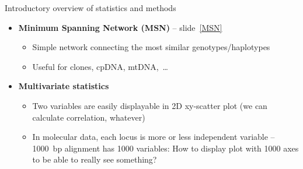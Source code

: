 \documentclass[compress, ucs, xelatex, 11pt, xcolor=svgnames,
  hyperref={
    bookmarks=true,
    unicode=true,
    colorlinks=true,
    pdftitle={Molecular data in R},
    plainpages=false,
    pdfauthor={Vojtech Zeisek},
    pdfsubject={Course about phylogeny and evolution in R},
    pdfcreator={XeLaTeX},
    pdfkeywords={R, evolution, phylogeny, molecular data},
    linkcolor=Tomato,
    anchorcolor=SaddleBrown,
    citecolor=Goldenrod,
    filecolor=DarkMagenta,
    menucolor=Sienna,
    urlcolor=DarkTurquoise,
    pdftex},
  url={hyphens, lowtilde} %
  ]{beamer}
\begin{document}
\begin{frame}[allowframebreaks]{Introductory overview of statistics and methods}
\begin{itemize}
\begin{itemize}
      \item \textbf{Hierarchical clustering} -- from slide~\ref{hierclust}
      \begin{itemize}
	\item Several methods clustering individuals according to their (dis)similarity from top or down into clusters
	\item (Un)weighted per-group mean average (\textbf{U/WPGMA}) and others
	\item Used more in ecology, for genetic data not so much anymore (following methods use to produce better results)
      \end{itemize}
      \item \textbf{Neighbor-Joining (NJ)} -- from slide~\ref{NJ}
      \begin{itemize}
	\item A tree starting from the two most similar individuals and connecting in the next steps next and next the most similar individual
	\item In some cases artificially chains individuals
	\item Several methods try to improve it -- slide~\ref{NJ-replacement}
      \end{itemize}
      \item \textbf{Principal Coordinates Analysis (PCoA)} -- from slide~\ref{pcoa}
      \begin{itemize}
	\item The most common method of multivariate statistics for genetic data
	\item Shows individuals in 2D scatter plot to retain maximum variability (by finding correlations among loci)
      \end{itemize}
    \end{itemize}
    \item \textbf{Minimum Spanning Network (MSN)} -- slide~\ref{MSN}
    \begin{itemize}
      \item Simple network connecting the most similar genotypes/haplotypes
      \item Useful for clones, cpDNA, mtDNA,~\ldots
      \end{itemize}
    \item \textbf{Multivariate statistics}
    \begin{itemize}
      \item Two variables are easily displayable in 2D xy-scatter plot (we can calculate correlation, whatever)
      \item In molecular data, each locus is more or less independent variable -- 1000~bp alignment has 1000 variables: How to display plot with 1000 axes to be able to really see something?

\end{itemize}
\end{itemize}
\end{frame}
\end{document}
